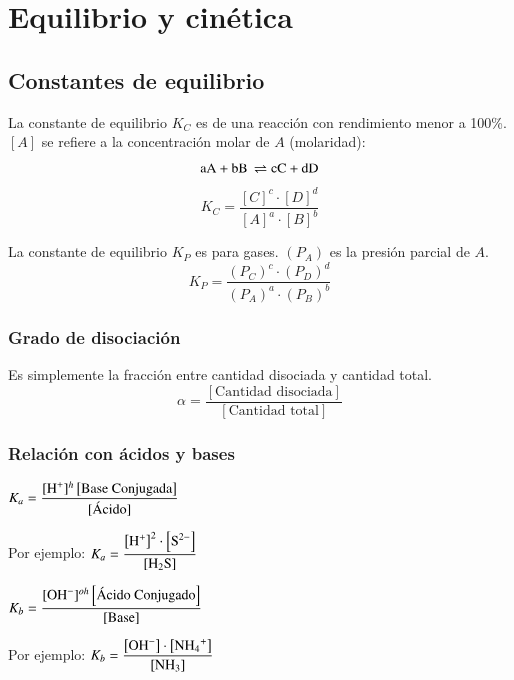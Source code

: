 \section{Equilibrio y cinética}

\subsection*{Constantes de equilibrio}

La constante de equilibrio $K_C$ es de una reacción con rendimiento menor a 100\%. $[A]$ se refiere a la concentración molar de $A$ (molaridad):
$$\ce{
aA + bB \rightleftharpoons cC + dD
}$$
$$
K_C = \dfrac{[C]^c \cdot [D]^d}{[A]^a\cdot [B]^b}
$$

La constante de equilibrio $K_P$ es para gases. $(P_A)$ es la presión parcial de $A$.
$$
K_P = \dfrac{(P_C)^c \cdot (P_D)^d}{(P_A)^a \cdot (P_B)^b}
$$


\subsubsection*{Grado de disociación}

Es simplemente la fracción entre cantidad disociada y cantidad total.
$$\alpha = \dfrac{[\text{Cantidad disociada}]}{[\text{Cantidad total}]}$$


\subsubsection*{Relación con ácidos y bases}

\begin{multicols}{2}
    \hfil
    $K_a = \dfrac{[\ce{H^+}]^{h}\left[\text{Base Conjugada}\right]}{[\text{Ácido}]}$
    \hfil

    \columnbreak

    Por ejemplo:
    \hfil
    $K_a = \dfrac{ \left[\ce{H^+}\right]^{2} \cdot \left[\ce{S^{2-}}\right]}
    {\left[ \ce{H2S} \right]}$
    \hfil
\end{multicols}

\begin{multicols}{2}
    \hfil
    $K_b = \dfrac{[\ce{OH^-}]^{oh}\left[\text{Ácido Conjugado}\right]}{[\text{Base}]}$
    \hfil
    
    \columnbreak
    
    Por ejemplo:
    \hfil
    $K_b = \dfrac{ \left[\ce{OH^-}\right] \cdot \left[\ce{NH4^{+}}\right]}
    {\left[ \ce{NH3} \right]}$
    \hfil
\end{multicols}

